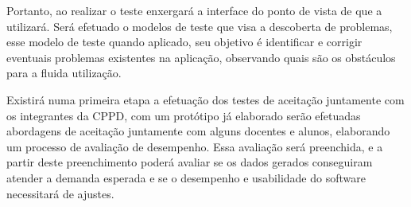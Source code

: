     Portanto, ao realizar o teste enxergará a interface do ponto de vista de que a utilizará. Será efetuado o modelos de teste que visa a descoberta de problemas, esse modelo de teste quando aplicado, seu objetivo é identificar e corrigir eventuais problemas existentes na aplicação, observando quais são os obstáculos para a fluida utilização.
    
    Existirá numa primeira etapa a efetuação dos testes de aceitação juntamente com os integrantes da CPPD, com um protótipo já elaborado serão efetuadas abordagens de aceitação juntamente com alguns docentes e alunos, elaborando um processo de avaliação de desempenho. Essa avaliação será preenchida, e a partir deste preenchimento poderá avaliar se os dados gerados conseguiram atender a demanda esperada e se o desempenho e usabilidade do software necessitará de ajustes.


 
